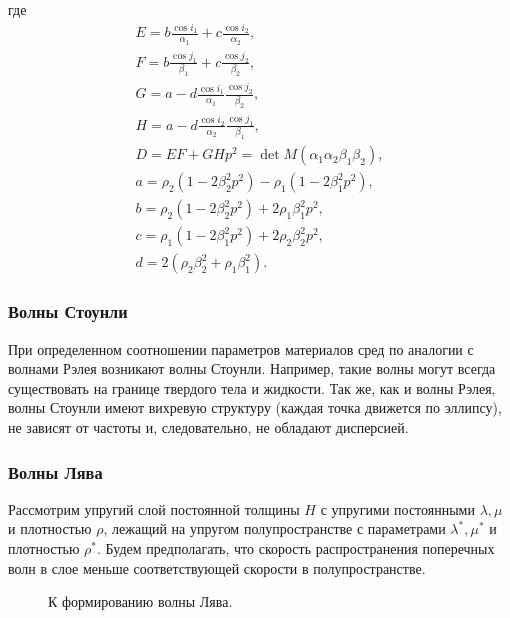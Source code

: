 где
\begin{eqnarray}
E = b \frac{\cos{i_1}}{\alpha_1} + c \frac{\cos{i_2}}{\alpha_2}, \nonumber\\
F = b \frac{\cos{j_1}}{\beta_1} + c \frac{\cos{j_2}}{\beta_2}, \nonumber\\
G = a - d \frac{\cos{i_1}}{\alpha_1} \frac{\cos{j_2}}{\beta_2}, \nonumber\\
H = a - d \frac{\cos{i_2}}{\alpha_2} \frac{\cos{j_1}}{\beta_1}, \nonumber\\
D = EF + GHp^2 = \det{M}(\alpha_1 \alpha_2 \beta_1 \beta_2), \nonumber\\
a = \rho_2 (1 - 2 \beta_2^2 p^2) - \rho_1 (1 - 2 \beta_1^2 p^2), \nonumber\\
b = \rho_2 (1 - 2 \beta_2^2 p^2) + 2 \rho_1 \beta_1^2 p^2, \nonumber\\
c = \rho_1 (1 - 2 \beta_1^2 p^2) + 2 \rho_2 \beta_2^2 p^2, \nonumber\\
d = 2 (\rho_2 \beta_2^2 + \rho_1 \beta_1^2).
\end{eqnarray}


\subsubsection{Волны Стоунли}

При определенном соотношении параметров материалов сред по аналогии с волнами Рэлея возникают волны Стоунли. Например, такие волны могут всегда существовать на границе твердого тела и жидкости. Так же, как и волны Рэлея, волны Стоунли имеют вихревую структуру (каждая точка движется по эллипсу), не зависят от частоты и, следовательно, не обладают дисперсией. 


\subsubsection{Волны Лява}

Рассмотрим упругий слой постоянной толщины $H$ с упругими постоянными $\lambda, \mu$ и плотностью $\rho$, лежащий на упругом полупространстве с параметрами $\lambda^*, \mu^*$ и плотностью $\rho^*$. Будем предполагать, что скорость распространения поперечных волн в слое меньше соответствующей скорости в полупространстве. 

\begin{figure}[h]
\caption{К формированию волны Лява.}
\end{figure}

